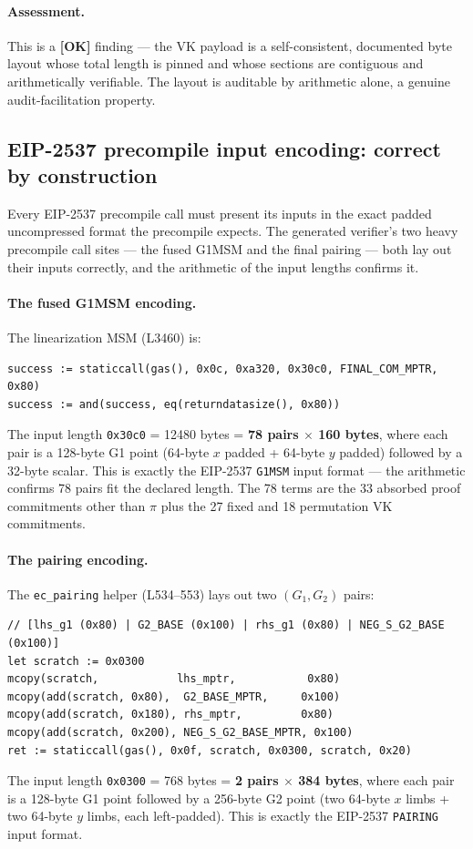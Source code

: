 \paragraph{Assessment.} This is a
\textcolor{tracegreen}{\textbf{[OK]}} finding --- the VK payload
is a self-consistent, documented byte layout whose total length is
pinned and whose sections are contiguous and arithmetically
verifiable. The layout is auditable by arithmetic alone, a
genuine audit-facilitation property.

\subsection{EIP-2537 precompile input encoding: correct by construction}
\label{sec:pr-precompile-encoding}

Every EIP-2537 precompile call must present its inputs in the
exact padded uncompressed format the precompile expects. The
generated verifier's two heavy precompile call sites --- the
fused G1MSM and the final pairing --- both lay out their inputs
correctly, and the arithmetic of the input lengths confirms it.

\paragraph{The fused G1MSM encoding.} The linearization MSM
(L3460) is:
\begin{lstlisting}[style=yul]
success := staticcall(gas(), 0x0c, 0xa320, 0x30c0, FINAL_COM_MPTR, 0x80)
success := and(success, eq(returndatasize(), 0x80))
\end{lstlisting}
The input length \texttt{0x30c0} = 12480 bytes = \textbf{78
pairs $\times$ 160 bytes}, where each pair is a 128-byte G1 point
(64-byte $x$ padded + 64-byte $y$ padded) followed by a 32-byte
scalar. This is exactly the EIP-2537 \texttt{G1MSM} input format
--- the arithmetic confirms 78 pairs fit the declared length. The
78 terms are the 33 absorbed proof commitments other than $\pi$
plus the 27 fixed and 18 permutation VK commitments.

\paragraph{The pairing encoding.} The \texttt{ec\_pairing} helper
(L534--553) lays out two $(G_1, G_2)$ pairs:
\begin{lstlisting}[style=yul]
// [lhs_g1 (0x80) | G2_BASE (0x100) | rhs_g1 (0x80) | NEG_S_G2_BASE (0x100)]
let scratch := 0x0300
mcopy(scratch,            lhs_mptr,           0x80)
mcopy(add(scratch, 0x80),  G2_BASE_MPTR,     0x100)
mcopy(add(scratch, 0x180), rhs_mptr,         0x80)
mcopy(add(scratch, 0x200), NEG_S_G2_BASE_MPTR, 0x100)
ret := staticcall(gas(), 0x0f, scratch, 0x0300, scratch, 0x20)
\end{lstlisting}
The input length \texttt{0x0300} = 768 bytes = \textbf{2 pairs
$\times$ 384 bytes}, where each pair is a 128-byte G1 point
followed by a 256-byte G2 point (two 64-byte $x$ limbs + two
64-byte $y$ limbs, each left-padded). This is exactly the
EIP-2537 \texttt{PAIRING} input format.

